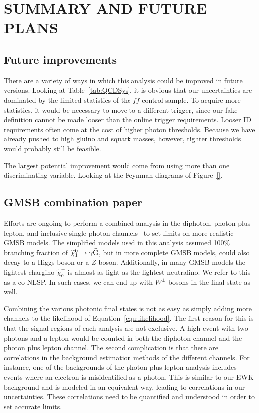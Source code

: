 \chapter{SUMMARY AND FUTURE PLANS}
\label{chap:Conclusions}

\section{Future improvements}
\label{sec:future}

There are a variety of ways in which this analysis could be improved in
future versions. Looking at Table~\ref{tab:QCDSys}, it is obvious that 
our uncertainties are dominated by the limited statistics of the $ff$ control 
sample. To acquire more statistics, it would be necessary to move to a
different trigger, since our fake definition cannot be made looser than 
the online trigger requirements. Looser ID requirements often
come at the cost of higher photon \pT thresholds. Because we 
have already pushed to high gluino and squark masses, however,
tighter \pT thresholds would probably still be feasible.

The largest potential improvement would come from using more than 
one discriminating variable. Looking at the Feynman diagrams of 
Figure~\ref{}.

\section{GMSB combination paper}
\label{sec:combo}
Efforts are ongoing to perform a combined analysis in the diphoton,
photon plus lepton, and inclusive single photon channels~\cite{PhotonHT, PhotonMET} to set limits on 
more realistic GMSB models. The simplified models used in this 
analysis assumed 100\% branching fraction of $\widetilde{\chi}^{0}_{1} \rightarrow \gamma\widetilde{\mathrm{G}}$,
but in more complete GMSB models, \neutralino could also decay to a Higgs boson 
or a $Z$ boson. Additionally, in many GMSB models the lightest chargino $\widetilde{\chi}^\pm_0$
is almost as light as the lightest neutralino. We refer to this as a co-NLSP. In such cases, 
we can end up with $W^\pm$ bosons in the final state as well. 

Combining the various photonic final states is not as easy as simply adding more 
channels to the likelihood of Equation~\ref{equ:likelihood}. The first reason for this is
that the signal regions of each analysis are not exclusive. A high-\ETmiss event with two photons 
and a lepton would be counted in both the diphoton channel and the photon plus lepton channel.
The second complication is that there are correlations
in the background estimation methods of the different channels.
For instance, one of the backgrounds of the 
photon plus lepton analysis includes events where an electron is misidentified as a photon.
This is similar to our EWK background and is modeled in an equivalent way, leading to 
correlations in our uncertainties. These correlations need to be quantified and understood 
in order to set accurate limits.

